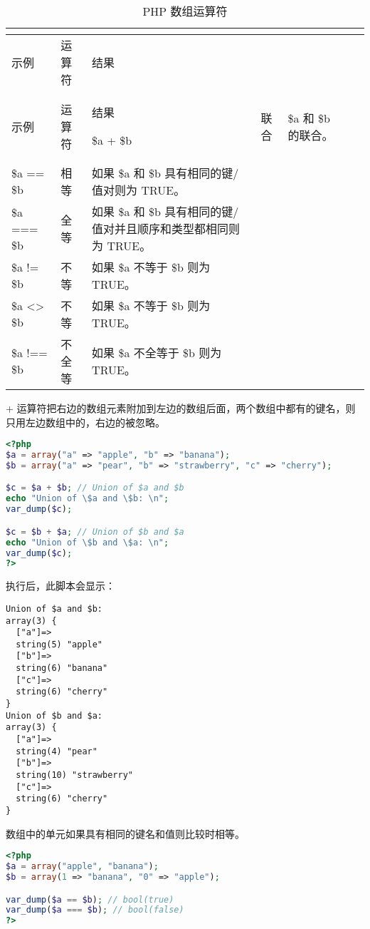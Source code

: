 \begin{longtable}{|l|l|l|}
\tabularnewline\hline
示例&运算符		&结果
\endhead

\caption{PHP 数组运算符}\\
\hline
示例&运算符		&结果
\endfirsthead

\endfoot

\endlastfoot
\hline
\$a + \$b		&联合	&\$a 和 \$b 的联合。\\
\hline
\$a == \$b	&相等	&如果 \$a 和 \$b 具有相同的键/值对则为 TRUE。\\
\hline
\$a === \$b	&全等	&如果 \$a 和 \$b 具有相同的键/值对并且顺序和类型都相同则为 TRUE。\\
\hline
\$a != \$b	&不等	&如果 \$a 不等于 \$b 则为 TRUE。\\
\hline
\$a <> \$b	&不等	&如果 \$a 不等于 \$b 则为 TRUE。\\
\hline
\$a !== \$b	&不全等	&如果 \$a 不全等于 \$b 则为 TRUE。\\
\hline
\end{longtable}

+ 运算符把右边的数组元素附加到左边的数组后面，两个数组中都有的键名，则只用左边数组中的，右边的被忽略。

\begin{lstlisting}[language=PHP]
<?php
$a = array("a" => "apple", "b" => "banana");
$b = array("a" => "pear", "b" => "strawberry", "c" => "cherry");

$c = $a + $b; // Union of $a and $b
echo "Union of \$a and \$b: \n";
var_dump($c);

$c = $b + $a; // Union of $b and $a
echo "Union of \$b and \$a: \n";
var_dump($c);
?>
\end{lstlisting}

执行后，此脚本会显示：

\begin{verbatim}
Union of $a and $b:
array(3) {
  ["a"]=>
  string(5) "apple"
  ["b"]=>
  string(6) "banana"
  ["c"]=>
  string(6) "cherry"
}
Union of $b and $a:
array(3) {
  ["a"]=>
  string(4) "pear"
  ["b"]=>
  string(10) "strawberry"
  ["c"]=>
  string(6) "cherry"
}
\end{verbatim}

数组中的单元如果具有相同的键名和值则比较时相等。

\begin{lstlisting}[language=PHP]
<?php
$a = array("apple", "banana");
$b = array(1 => "banana", "0" => "apple");

var_dump($a == $b); // bool(true)
var_dump($a === $b); // bool(false)
?>
\end{lstlisting}


